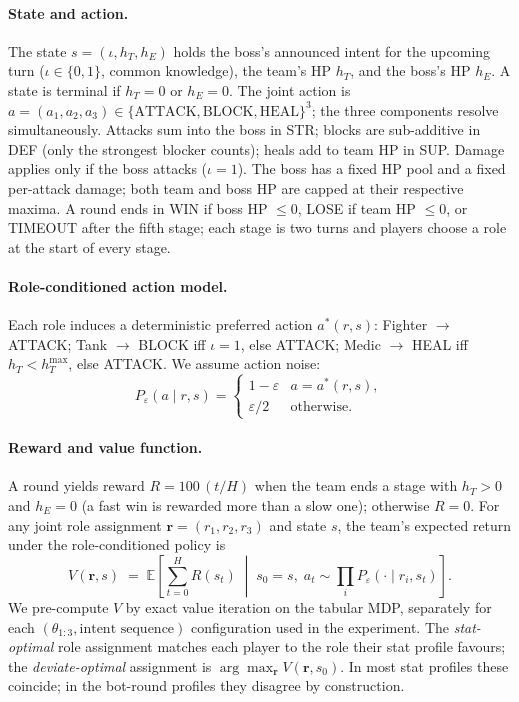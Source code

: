 \documentclass[9pt,twocolumn,twoside]{pnas-new}
\begin{document}
{\paragraph*{State and action.} The state $s = (\iota, h_T, h_E)$
holds the boss's announced intent for the upcoming turn
($\iota \in \{0,1\}$, common knowledge), the team's HP $h_T$, and
the boss's HP $h_E$. A state is terminal if $h_T = 0$ or $h_E = 0$.
The joint action is
$a = (a_1, a_2, a_3) \in \{\mathrm{ATTACK}, \mathrm{BLOCK}, \mathrm{HEAL}\}^3$;
the three components resolve simultaneously. Attacks sum into the
boss in STR; blocks are sub-additive in DEF (only the strongest
blocker counts); heals add to team HP in SUP. Damage applies only if
the boss attacks ($\iota = 1$). The boss has a fixed HP pool and a
fixed per-attack damage; both team and boss HP are capped at their
respective maxima. A round ends in WIN if boss HP $\leq 0$, LOSE if
team HP $\leq 0$, or TIMEOUT after the fifth stage; each stage is
two turns and players choose a role at the start of every stage.

\paragraph*{Role-conditioned action model.} Each role induces a
deterministic preferred action $a^*(r, s)$: Fighter $\to$ ATTACK;
Tank $\to$ BLOCK iff $\iota = 1$, else ATTACK; Medic $\to$ HEAL iff
$h_T < h_T^{\max}$, else ATTACK. We assume action noise:
\begin{equation}\label{eq:action-noise}
P_\varepsilon(a \mid r, s) =
\begin{cases} 1-\varepsilon & a = a^*(r,s),\\
\varepsilon/2 & \text{otherwise.}\end{cases}
\end{equation}

\paragraph*{Reward and value function.} A round yields reward
$R = 100\,(t/H)$ when the team ends a stage with $h_T > 0$ and
$h_E = 0$ (a fast win is rewarded more than a slow one); otherwise
$R = 0$. For any joint role assignment $\mathbf{r} = (r_1, r_2, r_3)$
and state $s$, the team's expected return under the role-conditioned
policy is
\begin{equation}\label{eq:value}
V(\mathbf{r}, s) \;=\;
\mathbb{E}\!\left[\sum_{t=0}^{H} R(s_t) \;\middle|\; s_0=s,\;
a_t \!\sim\! \textstyle\prod_i P_\varepsilon(\cdot \mid r_i, s_t)\right].
\end{equation}
We pre-compute $V$ by exact value iteration on the tabular MDP,
separately for each $(\theta_{1:3}, \text{intent sequence})$
configuration used in the experiment. The \emph{stat-optimal} role
assignment matches each player to the role their stat profile
favours; the \emph{deviate-optimal} assignment is
$\arg\max_{\mathbf{r}} V(\mathbf{r}, s_0)$. In most stat profiles
these coincide; in the bot-round profiles they disagree by
construction.

}
\end{document}

